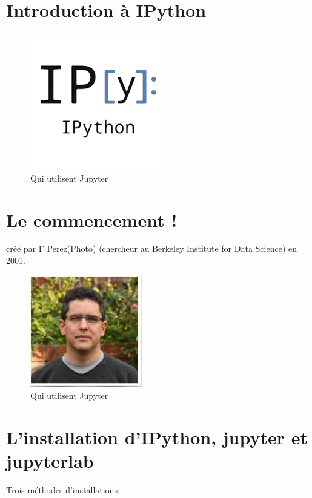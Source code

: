 \documentclass[11pt]{article}
\makeatletter
\def\maxwidth{\ifdim\Gin@nat@width>\linewidth\linewidth
    \else\Gin@nat@width\fi}
\let\Oldincludegraphics\includegraphics
\renewcommand{\includegraphics}[1]{\Oldincludegraphics[width=.8\maxwidth]{#1}}
\makeatother
\begin{document}
    \section{Introduction à IPython}\label{introduction-uxe0-ipython}

\begin{figure}
\centering
\includegraphics{images/ipython.png}
\caption{Qui utilisent Jupyter}
\end{figure}

    \section{Le commencement !}\label{le-commencement}

créé par F Perez(Photo) (chercheur au Berkeley Institute for Data
Science) en 2001.

\begin{figure}
\centering
\includegraphics{images/perez.jpg}
\caption{Qui utilisent Jupyter}
\end{figure}

    \section{L'installation d'IPython, jupyter et
jupyterlab}\label{linstallation-dipython-jupyter-et-jupyterlab}

Trois méthodes d'installations:
\end{document}
